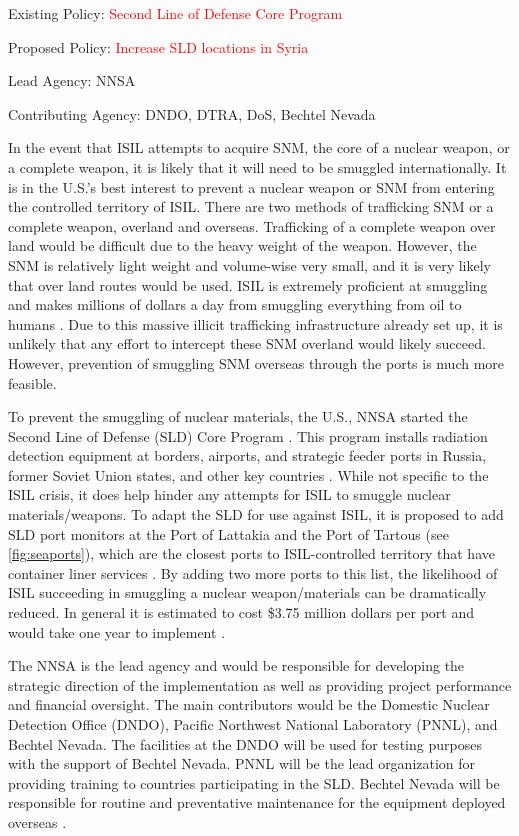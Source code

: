 \documentclass{report}
\begin{document}
Existing Policy: \textcolor{red}{Second Line of Defense Core Program} 

Proposed Policy: \textcolor{red}{Increase SLD locations in Syria}

Lead Agency: NNSA

Contributing Agency: DNDO, DTRA, DoS, Bechtel Nevada  \normalfont



In the event that ISIL attempts to acquire SNM, the core of a nuclear weapon, or a complete weapon, it is likely that it will need to be smuggled internationally. It is in the U.S.'s best interest to prevent a nuclear weapon or SNM from entering the controlled territory of ISIL. There are two methods of trafficking SNM or a complete weapon, overland and overseas. Trafficking of a complete weapon over land would be difficult due to the heavy weight of the weapon. However, the SNM is relatively light weight and volume-wise very small, and it is very likely that over land routes would be used. ISIL is extremely proficient at smuggling and makes millions of dollars a day from smuggling everything from oil to humans \cite{Amos2014}. Due to this massive illicit trafficking infrastructure already set up, it is unlikely that any effort to intercept these SNM overland would likely succeed. However, prevention of smuggling SNM overseas through the ports is much more feasible. 

To prevent the smuggling of nuclear materials, the U.S., NNSA started the Second Line of Defense (SLD) Core Program  \cite{Kilmartin2010}. This program installs radiation detection equipment at borders, airports, and strategic feeder ports in Russia, former Soviet Union states, and other key countries \cite{Kilmartin2010}. While not specific to the ISIL crisis, it does help hinder any attempts for ISIL to smuggle nuclear materials/weapons. To adapt the SLD for use against ISIL, it is proposed to add SLD port monitors at the Port of Lattakia and the Port of Tartous (see \autoref{fig:seaports}), which are the closest ports to ISIL-controlled territory that have container liner services \cite{WorldPortSource2005}.  By adding two more ports to this list, the likelihood of ISIL succeeding in smuggling a nuclear weapon/materials can be dramatically reduced. In general it is estimated to cost \$3.75 million dollars per port and would take one year to implement \cite{Aloise2005}. 

The NNSA is the lead agency and would be responsible for developing the strategic direction of the implementation as well as providing project performance and financial oversight. The main contributors would be the Domestic Nuclear Detection Office (DNDO), Pacific Northwest National Laboratory (PNNL), and Bechtel Nevada. The facilities at the DNDO will be used for testing purposes with the support of Bechtel Nevada. PNNL will be the lead organization for providing training to countries participating in the SLD. Bechtel Nevada will be responsible for routine and preventative maintenance for the equipment deployed overseas \cite{NationalNuclearSecurityAdministration2006}. 
\end{document}
